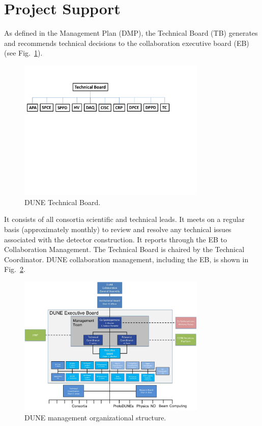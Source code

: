 \section{Project Support}
\label{sec:fdsp-coord-supp}

As defined in the  Management Plan (DMP), the 
Technical Board (TB) generates and recommends technical decisions to the 
collaboration executive board (EB) (see Fig.~\ref{fig:TB_org}).
\begin{figure}[htb]
  \begin{center}
    \includegraphics[width=0.8\textwidth]{far-detector-generic/figures/TB_Org_Chart}
    \caption{DUNE Technical Board.}
    \label{fig:TB_org}
  \end{center}
\end{figure}
It consists of all consortia scientific and technical leads. It meets
on a regular basis (approximately monthly) to review and resolve any
technical issues associated with the detector construction. It reports
through the EB to Collaboration Management. The  Technical
Board is chaired by the Technical Coordinator. DUNE collaboration
management, including the EB, is shown in Fig.~\ref{fig:DUNE_org}.
\begin{figure}[htb]
  \begin{center}
    \includegraphics[width=0.8\textwidth]{far-detector-generic/figures/DUNE_mgmt}
    \caption{DUNE management organizational structure.}
    \label{fig:DUNE_org}
  \end{center}
\end{figure}



